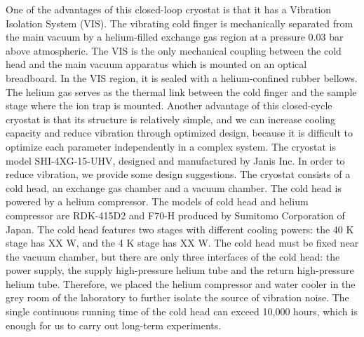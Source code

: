 One of the advantages of this closed-loop cryostat is that it has a Vibration Isolation System (VIS). The vibrating cold finger is mechanically separated from the main vacuum by a helium-filled exchange gas region at a pressure 0.03 bar above atmospheric. The VIS is the only mechanical coupling between the cold head and the main vacuum apparatus which is mounted on an optical breadboard. In the VIS region, it is sealed with a helium-confined rubber bellows. The helium gas serves as the thermal link between the cold finger and the sample stage where the ion trap is mounted.
Another advantage of this closed-cycle cryostat is that its structure is relatively simple, and we can increase cooling capacity and reduce vibration through optimized design, because it is difficult to optimize each parameter independently in a complex system.
The cryostat is model SHI-4XG-15-UHV, designed and manufactured by Janis Inc. In order to reduce vibration, we provide some design suggestions. The cryostat consists of a cold head, an exchange gas chamber and a vacuum chamber.
The cold head is powered by a helium compressor. The models of cold head and helium compressor are RDK-415D2 and F70-H produced by Sumitomo Corporation of Japan. The cold head features two stages with different cooling powers: the 40 K stage has XX W, and the 4 K stage has XX W. The cold head must be fixed near the vacuum chamber, but there are only three interfaces of the cold head: the power supply, the supply high-pressure helium tube and the return high-pressure helium tube. Therefore, we placed the helium compressor and water cooler in the grey room of the laboratory to further isolate the source of vibration noise. The single continuous running time of the cold head can exceed 10,000 hours, which is enough for us to carry out long-term experiments.
